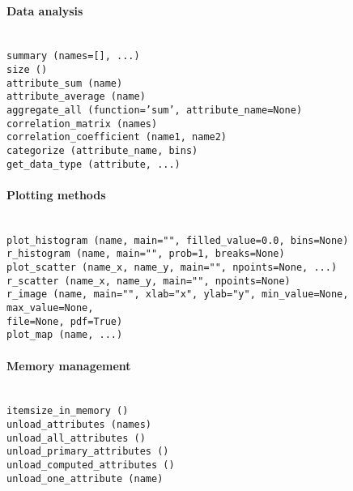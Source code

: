 \paragraph{Data analysis}~\\[1mm]
{\tt summary (names=[], ...)}  \\
{\tt size ()}  \\
{\tt attribute_sum (name)}  \\
{\tt attribute_average (name)}  \\
{\tt aggregate_all (function='sum', attribute_name=None)}  \\
{\tt correlation_matrix (names)}  \\
{\tt correlation_coefficient (name1, name2)}  \\
{\tt categorize (attribute_name, bins)}  \\
{\tt get_data_type (attribute, ...)}

\paragraph{Plotting methods}~\\[1mm]
{\tt plot_histogram (name, main="", filled_value=0.0, bins=None)}  \\
{\tt r_histogram (name, main="", prob=1, breaks=None)}  \\
{\tt plot_scatter (name_x, name_y, main="", npoints=None, ...)}  \\
{\tt r_scatter (name_x, name_y, main="", npoints=None)}  \\
{\tt r_image (name, main="", xlab="x", ylab="y", min_value=None, max_value=None, }\\
\hspace*{3cm} {\tt file=None, pdf=True)}  \\
{\tt plot_map (name, ...)}

\paragraph{Memory management}~\\[1mm]
{\tt itemsize_in_memory ()}  \\
{\tt unload_attributes (names)}  \\
{\tt unload_all_attributes ()}  \\
{\tt unload_primary_attributes ()}  \\
{\tt unload_computed_attributes ()}  \\
{\tt unload_one_attribute (name)}

